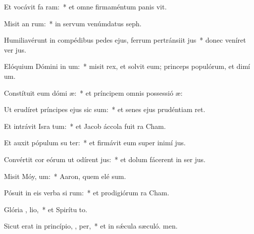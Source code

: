 \item Et vocávit fa  ram:~* et omne firmaméntum panis vit.
\item Misit an  rum:~* in servum venúmdatus  seph.
\item Humiliavérunt in compédibus pedes ejus, ferrum pertránsiit  jus~* donec veníret ver jus.
\item Elóquium Dómini in um:~* misit rex, et solvit eum; princeps populórum, et dimí um.
\item Constítuit eum dómi  æ:~* et príncipem omnis possessió æ:
\item Ut erudíret príncipes ejus sic sum:~* et senes ejus prudéntiam ret.
\item Et intrávit Isra  tum:~* et Jacob áccola fuit  ra Cham.
\item Et auxit pópulum su ter:~* et firmávit eum super inimí jus.
\item Convértit cor eórum ut odírent  jus:~* et dolum fácerent in ser jus.
\item Misit Móy,  um:~* Aaron, quem elé sum.
\item Pósuit in eis verba si rum:~* et prodigiórum  ra Cham.
\item Glória ,  lio,~* et Spirítu to.
\item Sicut erat in princípio,  ,  per,~* et in sǽcula sæculó. men.
